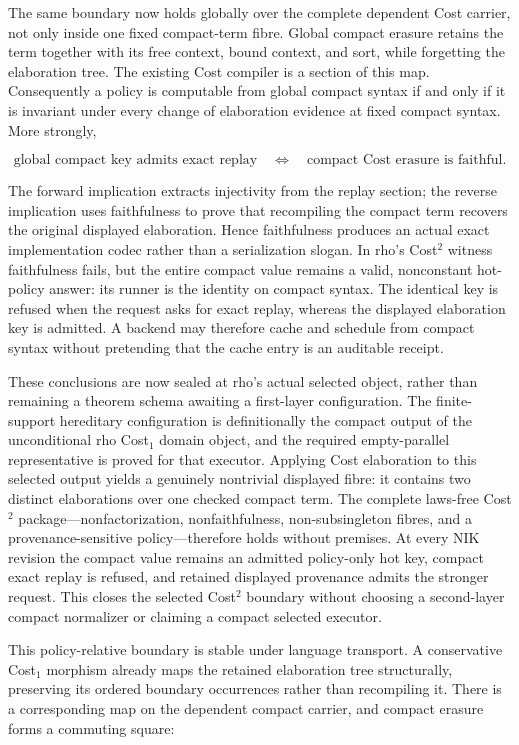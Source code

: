 \documentclass[11pt]{article}
\begin{document}
The same boundary now holds globally over the complete dependent Cost carrier,
not only inside one fixed compact-term fibre.  Global compact erasure retains
the term together with its free context, bound context, and sort, while
forgetting the elaboration tree.  The existing Cost compiler is a section of
this map.  Consequently a policy is computable from global compact syntax if
and only if it is invariant under every change of elaboration evidence at fixed
compact syntax.  More strongly,

\[
  \text{global compact key admits exact replay}
  \quad\Longleftrightarrow\quad
  \text{compact Cost erasure is faithful}.
\]

The forward implication extracts injectivity from the replay section; the
reverse implication uses faithfulness to prove that recompiling the compact
term recovers the original displayed elaboration.  Hence faithfulness produces
an actual exact implementation codec rather than a serialization slogan.  In
rho's Cost$^2$ witness faithfulness fails, but the entire compact value remains
a valid, nonconstant hot-policy answer: its runner is the identity on compact
syntax.  The identical key is refused when the request asks for exact replay,
whereas the displayed elaboration key is admitted.  A backend may therefore
cache and schedule from compact syntax without pretending that the cache entry
is an auditable receipt.

These conclusions are now sealed at rho's actual selected object, rather than
remaining a theorem schema awaiting a first-layer configuration.  The
finite-support hereditary configuration is definitionally the compact output
of the unconditional rho Cost$_1$ domain object, and the required
empty-parallel representative is proved for that executor.  Applying Cost
elaboration to this selected output yields a genuinely nontrivial displayed
fibre: it contains two distinct elaborations over one checked compact term.
The complete laws-free Cost$^2$ package---nonfactorization, nonfaithfulness,
non-subsingleton fibres, and a provenance-sensitive policy---therefore holds
without premises.  At every NIK revision the compact value remains an admitted
policy-only hot key, compact exact replay is refused, and retained displayed
provenance admits the stronger request.  This closes the selected Cost$^2$
boundary without choosing a second-layer compact normalizer or claiming a
compact selected executor.

This policy-relative boundary is stable under language transport.  A
conservative Cost$_1$ morphism already maps the retained elaboration tree
structurally, preserving its ordered boundary occurrences rather than
recompiling it.  There is a corresponding map on the dependent compact
carrier, and compact erasure forms a commuting square:
\end{document}
